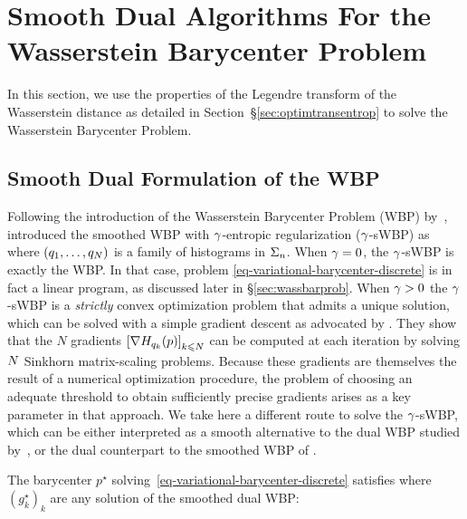 
\section{Smooth Dual Algorithms For the Wasserstein Barycenter Problem}\label{sec:dualalgo}

In this section, we use the properties of the Legendre transform of the Wasserstein distance as detailed in Section~\S\ref{sec:optimtransentrop} to solve the Wasserstein Barycenter Problem.


\subsection{Smooth Dual Formulation of the WBP}

Following the introduction of the Wasserstein Barycenter Problem (WBP) by~\cite{Carlier_wasserstein_barycenter},~\cite{cuturi2014fast} introduced the smoothed WBP with $\gamma$-entropic regularization ($\gamma$-sWBP) as
where $(q_1,\ldots,q_N)$ is a family of histograms in $\Sigma_n$. When $\gamma=0$, the $\gamma$-sWBP is exactly the WBP. In that case, problem \eqref{eq-variational-barycenter-discrete} is in fact a linear program, as discussed later in \S\ref{sec:wassbarprob}. When $\gamma>0$ the $\gamma$-sWBP is a \emph{strictly} convex optimization problem that admits a unique solution, which can be solved with a simple gradient descent as advocated by \cite{cuturi2014fast}. They show that the $N$ gradients $\left[\nabla H_{q_k}(p) \right]_{k \leqslant N}$ can be computed at each iteration by solving $N$ Sinkhorn matrix-scaling problems. Because these gradients are themselves the result of a numerical optimization procedure, the problem of choosing an adequate threshold to obtain sufficiently precise gradients arises as a key parameter in that approach.
%
We take here a different route to solve the $\gamma$-sWBP, which can be either interpreted as a smooth alternative to the dual WBP studied by~\cite{Carlier-NumericsBarycenters}, or the dual counterpart to the smoothed WBP of \cite{cuturi2014fast}.

\begin{theorem}\label{prop-dual-energy}
	The barycenter $p^\star$ solving~\eqref{eq-variational-barycenter-discrete} satisfies 
	where $( g_k^\star )_k$ are any solution of the smoothed dual WBP:
\end{theorem}

